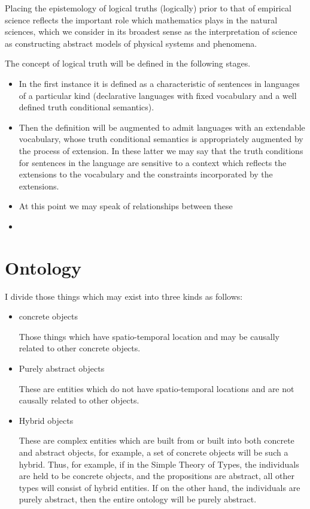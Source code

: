 \documentclass[10pt,titlepage]{book}
\begin{document}
Placing the epistemology of logical truths (logically) prior to that of empirical science reflects the important role which mathematics plays in the natural sciences, which we consider in its broadest sense as the interpretation of science as constructing abstract models of physical systems and phenomena.

The concept of logical truth will be defined in the following stages.
\begin{itemize}
  \item
    In the first instance it is defined as a characteristic of sentences in languages of a particular kind (declarative languages with fixed vocabulary and a well defined truth conditional semantics).
  \item
Then the definition will be augmented to admit languages with an extendable vocabulary, whose truth conditional semantics is appropriately augmented by the process of extension.
In these latter we may say that the truth conditions for sentences in the language are sensitive to a context which reflects the extensions to the vocabulary and the constraints incorporated by the extensions.
\item
At this point we may speak of relationships between these 
\item

\end{itemize}


\section{Ontology}

I divide those things which may exist into three kinds as follows:

\begin{itemize}

\item concrete objects

  Those things which have spatio-temporal location and may be causally related to other concrete objects.

\item Purely abstract objects

  These are entities which do not have spatio-temporal locations and are not causally related to other objects.

\item Hybrid objects

  These are complex entities which are built from or built into both concrete and abstract objects, for example, a set of concrete objects will be such a hybrid.
  Thus, for example, if in the Simple Theory of Types, the individuals are held to be concrete objects, and the propositions are abstract, all other types will consist of hybrid entities.
  If on the other hand, the individuals are purely abstract, then the entire ontology will be purely abstract.
\end{itemize}
\end{document}
